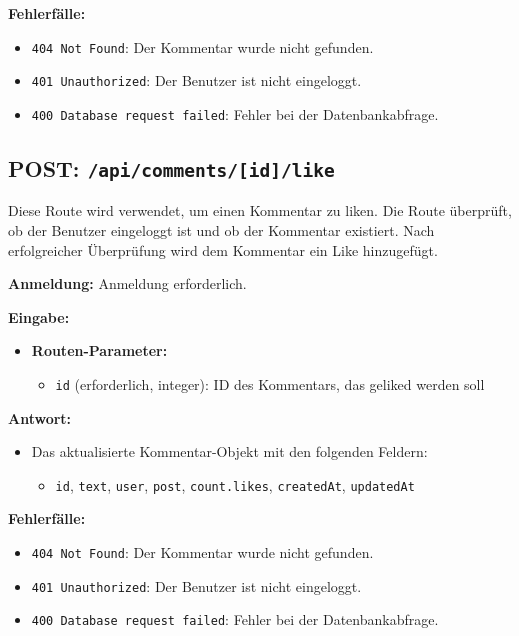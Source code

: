 \documentclass[a4paper,12pt]{article}
\begin{document}
\textbf{Fehlerfälle:}
\begin{itemize}
    \item \texttt{404 Not Found}:
        Der Kommentar wurde nicht gefunden.
    \item \texttt{401 Unauthorized}:
        Der Benutzer ist nicht eingeloggt.
    \item \texttt{400 Database request failed}:
        Fehler bei der Datenbankabfrage.
\end{itemize}

\newpage
\subsection{POST: \texttt{/api/comments/[id]/like}}

Diese Route wird verwendet, um einen Kommentar zu liken. Die Route überprüft,
ob der Benutzer eingeloggt ist und ob der Kommentar existiert. Nach
erfolgreicher Überprüfung wird dem Kommentar ein Like hinzugefügt.

\textbf{Anmeldung:} Anmeldung erforderlich.

\textbf{Eingabe:}
\begin{itemize}
    \item \textbf{Routen-Parameter:}
    \begin{itemize}
        \item \texttt{id} (erforderlich, integer):
            ID des Kommentars, das geliked werden soll
    \end{itemize}
\end{itemize}

\textbf{Antwort:}
\begin{itemize}
    \item Das aktualisierte Kommentar-Objekt mit den folgenden Feldern:
    \begin{itemize}
        \item \texttt{id},
              \texttt{text},
              \texttt{user},
              \texttt{post},
              \texttt{count.likes},
              \texttt{createdAt},
              \texttt{updatedAt}
    \end{itemize}
\end{itemize}

\textbf{Fehlerfälle:}
\begin{itemize}
    \item \texttt{404 Not Found}:
        Der Kommentar wurde nicht gefunden.
    \item \texttt{401 Unauthorized}:
        Der Benutzer ist nicht eingeloggt.
    \item \texttt{400 Database request failed}:
        Fehler bei der Datenbankabfrage.
\end{itemize}
\end{document}
